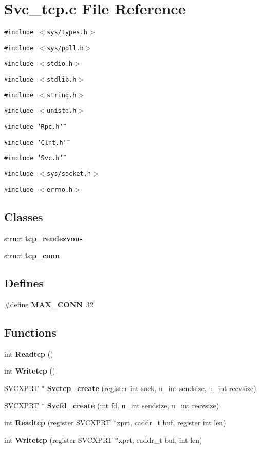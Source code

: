 \section{Svc\_\-tcp.c File Reference}
\label{Svc__tcp_8c}
{\tt \#include $<$sys/types.h$>$}\par
{\tt \#include $<$sys/poll.h$>$}\par
{\tt \#include $<$stdio.h$>$}\par
{\tt \#include $<$stdlib.h$>$}\par
{\tt \#include $<$string.h$>$}\par
{\tt \#include $<$unistd.h$>$}\par
{\tt \#include \char`\"{}Rpc.h\char`\"{}}\par
{\tt \#include \char`\"{}Clnt.h\char`\"{}}\par
{\tt \#include \char`\"{}Svc.h\char`\"{}}\par
{\tt \#include $<$sys/socket.h$>$}\par
{\tt \#include $<$errno.h$>$}\par
\subsection*{Classes}
\begin{CompactItemize}
\item 
struct {\bf tcp\_\-rendezvous}
\item 
struct {\bf tcp\_\-conn}
\end{CompactItemize}
\subsection*{Defines}
\begin{CompactItemize}
\item 
\#define {\bf MAX\_\-CONN}\ 32
\end{CompactItemize}
\subsection*{Functions}
\begin{CompactItemize}
\item 
int {\bf Readtcp} ()
\item 
int {\bf Writetcp} ()
\item 
SVCXPRT $\ast$ {\bf Svctcp\_\-create} (register int sock, u\_\-int sendsize, u\_\-int recvsize)
\item 
SVCXPRT $\ast$ {\bf Svcfd\_\-create} (int fd, u\_\-int sendsize, u\_\-int recvsize)
\item 
int {\bf Readtcp} (register SVCXPRT $\ast$xprt, caddr\_\-t buf, register int len)
\item 
int {\bf Writetcp} (register SVCXPRT $\ast$xprt, caddr\_\-t buf, int len)
\end{CompactItemize}


